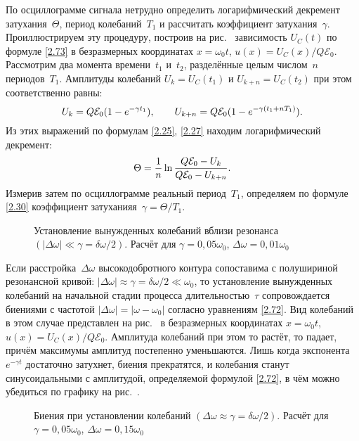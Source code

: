 По осциллограмме сигнала нетрудно определить
логарифмический декремент затухания~$\Theta$, период колебаний~$T_1$ 
и рассчитать коэффициент затухания~$\gamma$. Проиллюстрируем 
эту процедуру, построив на рис.~
зависимость $U_C(t)$ по формуле \eqref{2.73} в безразмерных координатах 
$x = \omega_0t$, $u(x) = U_C(x)/Q\mathcal{E}_0$.
Рассмотрим два момента времени~$t_1$ и~$t_2$, разделённые целым числом~$n$
периодов~$T_1$. Амплитуды колебаний $U_{k}=U_C(t_1)$ и 
$U_{k+n}=U_C(t_2)$ при этом соответственно равны:
\begin{equation*}\eqmark{2.74}
U_{k}=Q\mathcal{E}_0(1-e^{-\gamma t_1}), \qquad U_{k+n}=
Q\mathcal{E}_0(1-e^{-\gamma(t_1+nT_1)}).
\end{equation*}
Из этих выражений по формулам \eqref{2.25}, \eqref{2.27} находим логарифмический 
декремент:
\begin{equation}\eqmark{2.75}
\Theta=\dfrac{1}{n}\ln\dfrac{Q\mathcal{E}_0 -U_{k}}{Q\mathcal{E}_0 -U_{k+n}}.
\end{equation}
Измерив затем по осциллограмме реальный период~$T_1$, определяем 
по формуле \eqref{2.30} коэффициент затуханияя~$\gamma = \Theta/T_1$.

\begin{figure}[h!]
    \centering
    \caption{Установление вынужденных колебаний вблизи резонанса
        $(|\Delta\omega|\ll\gamma=\delta\omega/2)$. Расчёт для
        $\gamma = 0,05\omega_0$, $\Delta \omega = 0,01\omega_0$}
\end{figure}


Если расстройка~$\Delta\omega$ высокодобротного контура сопоставима с полушириной 
резонансной кривой: $|\Delta\omega|\approx\gamma=\delta\omega/2\ll\omega_0$,
то установление вынужденных колебаний на
начальной стадии процесса длительностью~$\tau$ сопровождается биениями с
частотой $|\Delta\omega|=|\omega-\omega_0|$ согласно уравнениям \eqref{2.72}.
Вид колебаний в этом случае представлен на рис.~ в безразмерных 
координатах $x = \omega_0t$, $u(x) = U_C(x)/Q\mathcal{E}_0$.
Амплитуда колебаний при этом то растёт, то падает, причём максимумы амплитуд
постепенно уменьшаются. Лишь когда экспонента~$e^{-\gamma t}$ достаточно
затухнет, биения прекратятся, и колебания станут синусоидальными с амплитудой, 
определяемой формулой \eqref{2.72}, в чём можно убедиться по графику на 
рис.~.

\begin{figure}[h!]
    \centering
    \caption{Биения при установлении колебаний
        $(\Delta\omega\approx\gamma=\delta\omega/2)$. Расчёт для
        $\gamma = 0,05\omega_0$, $\Delta \omega = 0,15\omega_0$}
\end{figure}


